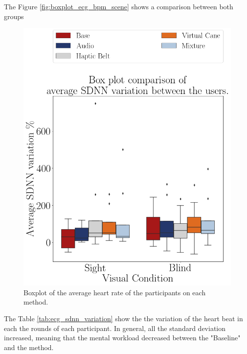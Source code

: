 The Figure \ref{fig:boxplot_ecg_bpm_scene} shows a comparison between both groups

\begin{figure}[!htb]
    \centering
    \includegraphics[width = 0.5\linewidth]{Resultados/ECG/Figuras/png/boxplot_ecg_sdnn_box_scene.png}
    \caption{Boxplot of the average heart rate of the participants on each method.}
    \label{fig:boxplot_ecg_sdnn_box_scene}
\end{figure}

The Table \ref{tab:ecg_sdnn_variation} show the the variation of the heart beat in each the rounds of each participant. In general, all the standard deviation increased, meaning that the mental workload decreased between the "Baseline" and the method.


